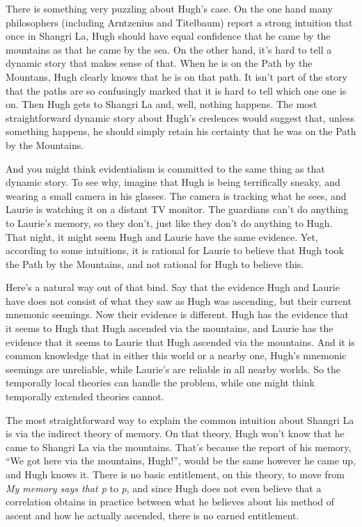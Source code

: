 There is something very puzzling about Hugh's case. On the one hand many philosophers (including Arntzenius and Titelbaum) report a strong intuition that once in Shangri La, Hugh should have equal confidence that he came by the mountains as that he came by the sea. On the other hand, it's hard to tell a dynamic story that makes sense of that. When he is on the Path by the Mountans, Hugh clearly knows that he is on that path. It isn't part of the story that the paths are so confusingly marked that it is hard to tell which one one is on. Then Hugh gets to Shangri La and, well, nothing happens. The most straightforward dynamic story about Hugh's credences would suggest that, unless something happens, he should simply retain his certainty that he was on the Path by the Mountains.

And you might think evidentialism is committed to the same thing as that dynamic story. To see why, imagine that Hugh is being terrifically sneaky, and wearing a small camera in his glasses. The camera is tracking what he sees, and Laurie is watching it on a distant TV monitor. The guardians can't do anything to Laurie's memory, so they don't, just like they don't do anything to Hugh. That night, it might seem Hugh and Laurie have the same evidence. Yet, according to some intuitions, it is rational for Laurie to believe that Hugh took the Path by the Mountains, and not rational for Hugh to believe this. 

Here's a natural way out of that bind. Say that the evidence Hugh and Laurie have does not consist of what they saw as Hugh was ascending, but their current mnemonic seemings. Now their evidence is different. Hugh has the evidence that it seems to Hugh that Hugh ascended via the mountains, and Laurie has the evidence that it seems to Laurie that Hugh ascended via the mountains. And it is common knowledge that in either this world or a nearby one, Hugh's mnemonic seemings are unreliable, while Laurie's are reliable in all nearby worlds. So the temporally local theories can handle the problem, while one might think temporally extended theories cannot. 

The most straightforward way to explain the common intuition about Shangri La is via the indirect theory of memory. On that theory, Hugh won't know that he came to Shangri La via the mountains. That's because the report of his memory, ``We got here via the mountains, Hugh!'', would be the same however he came up, and Hugh knows it. There is no basic entitlement, on this theory, to move from \emph{My memory says that p} to \emph{p}, and since Hugh does not even believe that a correlation obtains in practice between what he believes about his method of ascent and how he actually ascended, there is no earned entitlement.

